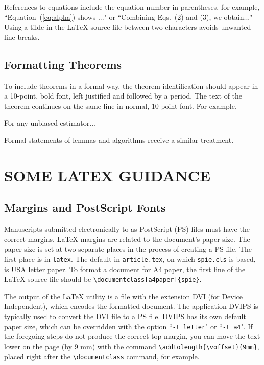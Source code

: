 \documentclass[]{spie}  %
\begin{document}
References to equations include the equation number in parentheses, for example, ``Equation~(\ref{eq:alpha}) shows ..." or ``Combining Eqs.~(2) and (3), we obtain..."  Using a tilde in the LaTeX source file between two characters avoids unwanted line breaks.

\subsection{Formatting Theorems} 

To include theorems in a formal way, the theorem identification should appear in a 10-point, bold font, left justified and followed by a period.  The text of the theorem continues on the same line in normal, 10-point font.  For example, 

 For any unbiased estimator...

Formal statements of lemmas and algorithms receive a similar treatment.

\section{SOME LATEX GUIDANCE} \label{sec:latex}

\subsection{Margins and PostScript Fonts}
 
Manuscripts submitted electronically to as PostScript (PS) files must have the correct margins. LaTeX margins are related to the document's paper size. The paper size is set at two separate places in the process of creating a PS file. The first place is in {\tt latex}. The default in {\tt article.tex}, on which {\tt spie.cls} is based, is USA letter paper. To format a document for A4 paper, the first line of the LaTeX source file should be \verb|\documentclass[a4paper]{spie}|.   

The output of the LaTeX utility is a file with the extension DVI (for Device Independent), which encodes the formatted document.  The application DVIPS is typically used to convert the DVI file to a PS file.  DVIPS has its own default paper size, which can be overridden with the option ``{\tt -t letter}" or ``{\tt -t a4}".  
If the foregoing steps do not produce the correct top margin, you can move the text lower on the page (by 9 mm) with the command \verb|\addtolength{\voffset}{9mm}|, placed right after the \verb|\documentclass| command, for example.
\end{document}
